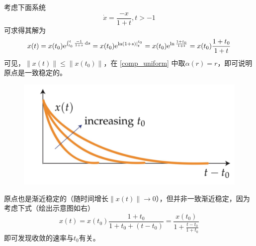 \begin{example}
  考虑下面系统
  \[\dot{x}=\frac{-x}{1+t},t>-1\]
  可求得其解为
  \begin{align*}
    x(t)=x(t_0)\mathrm{e}^{\int_{t_0}^t\frac{-1}{1+s}\mathop{}\!\mathrm{d} s}=x(t_0)\mathrm{e}^{\ln(1+s)|_t^{t_0}}
    =x(t_0)\mathrm{e}^{\ln\frac{1+t_0}{1+t}}=x(t_0)\frac{1+t_0}{1+t}
  \end{align*}
  可见，$\|x(t)\|\le\|x(t_0)\|$，在 \ref{comp_uniform} 中取$\alpha(r)=r$，即可说明原点是一致稳定的。

  \begin{figure}
    \vspace{-1em}
  	\includegraphics[width=0.95\linewidth]{./figure/nonlinear/not_uniform.png}
  \end{figure}

  \vspace{1em}
  原点也是渐近稳定的（随时间增长$\|x(t)\|\to0$），但并非一致渐近稳定，因为考虑下式（绘出示意图如右）
  \[x(t)=x(t_0)\frac{1+t_0}{1+t_0+(t-t_0)}=\frac{x(t_0)}{1+\frac{t-t_0}{1+t_0}}\]
  即可发现收敛的速率与$t_0$有关。
\end{example}



